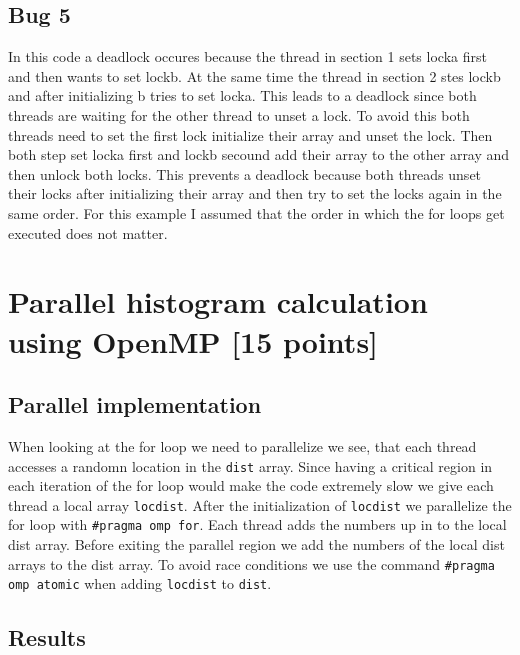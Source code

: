 \documentclass[unicode,11pt,a4paper,oneside,numbers=endperiod,openany]{scrartcl}
\begin{document}
\subsection{Bug 5}
In this code a deadlock occures because the thread in section 1 sets locka first and then wants to set lockb.
At the same time the thread in section 2 stes lockb and after initializing b tries to set locka.
This leads to a deadlock since both threads are waiting for the other thread to unset a lock.
To avoid this both threads need to set the first lock initialize their array and unset the lock.
Then both step set locka first and lockb secound add their array to the other array and then unlock both locks.
This prevents a deadlock because both threads unset their locks after initializing their array and then try to set the locks again in the same order.
For this example I assumed that the order in which the for loops get executed does not matter.



\section{Parallel histogram calculation using OpenMP [15 points]}

\subsection{Parallel implementation}
When looking at the for loop we need to parallelize we see, that each thread accesses a randomn location in the \texttt{dist} array.
Since having a critical region in each iteration of the for loop would make the code extremely slow we give each thread a local array \texttt{locdist}.
After the initialization of \texttt{locdist} we parallelize the for loop with \texttt{\#pragma omp for}.
Each thread adds the numbers up in to the local dist array. Before exiting the parallel region we add the numbers of the local dist arrays to the dist array.
To avoid race conditions we use the command \texttt{\#pragma omp atomic} when adding \texttt{locdist} to \texttt{dist}.

\subsection{Results}
\end{document}
